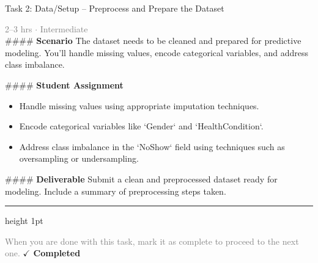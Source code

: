 \documentclass[10pt,a4paper]{article}
\begin{document}
\begin{taskbox}{Task 2: Data/Setup – Preprocess and Prepare the Dataset}

    {\small \textcolor{gray}{2--3 hrs $\cdot$ Intermediate}}\\[12pt]

    \#\#\#\# \textbf{Scenario}  
The dataset needs to be cleaned and prepared for predictive modeling. You’ll handle missing values, encode categorical variables, and address class imbalance.  

\#\#\#\# \textbf{Student Assignment}  
\begin{itemize}
    \item Handle missing values using appropriate imputation techniques.  
    \item Encode categorical variables like `Gender` and `HealthCondition`.  
    \item Address class imbalance in the `NoShow` field using techniques such as oversampling or undersampling.  
\end{itemize}

\#\#\#\# \textbf{Deliverable}  
Submit a clean and preprocessed dataset ready for modeling. Include a summary of preprocessing steps taken.\par

    \vspace{16pt}

    \textcolor{cardBorder}{\hrule height 1pt}\vspace{8pt}

    \small \textcolor{gray}{When you are done with this task, mark it as complete to proceed to the next one.} \hfill \textbf{\textcolor{brandDark}{$\checkmark$ Completed}}

\end{taskbox}
\end{document}
